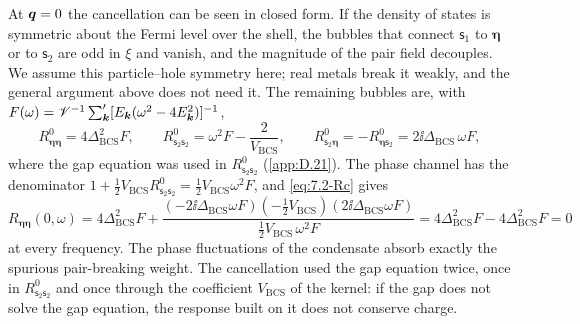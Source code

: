 At $\bm{q} = 0$ the cancellation can be seen in closed form. If the density of states is symmetric about the Fermi level over the shell, the bubbles that connect $\mathsf{s}_1$ to $\boldsymbol{\eta}$ or to $\mathsf{s}_2$ are odd in $\xi$ and vanish, and the magnitude of the pair field decouples. We assume this particle--hole symmetry here; real metals break it weakly, and the general argument above does not need it. The remaining bubbles are, with $F(\omega) = \mathscr{V}^{-1}\sum'_{\bm{k}}[E_{\bm{k}}(\omega^2 - 4E_{\bm{k}}^2)]^{-1}$,
\begin{equation}
  R^0_{\boldsymbol{\eta}\boldsymbol{\eta}} = 4\Delta_{\mathrm{BCS}}^2F, \qquad
  R^0_{\mathsf{s}_2\mathsf{s}_2} = \omega^2F - \frac{2}{V_{\mathrm{BCS}}}, \qquad
  R^0_{\mathsf{s}_2\boldsymbol{\eta}} = -R^0_{\boldsymbol{\eta}\mathsf{s}_2} = 2\ii\Delta_{\mathrm{BCS}}\,\omega F ,
  \label{eq:D.21-q0}
\end{equation}
where the gap equation was used in $R^0_{\mathsf{s}_2\mathsf{s}_2}$ (\cref{app:D.21}). The phase channel has the denominator $1 + \frac12V_{\mathrm{BCS}}R^0_{\mathsf{s}_2\mathsf{s}_2} = \frac12V_{\mathrm{BCS}}\omega^2F$, and \cref{eq:7.2-Rc} gives
\begin{equation}
  R_{\boldsymbol{\eta}\boldsymbol{\eta}}(0,\omega) = 4\Delta_{\mathrm{BCS}}^2F + \frac{(-2\ii\Delta_{\mathrm{BCS}}\omega F)(-\frac12V_{\mathrm{BCS}})(2\ii\Delta_{\mathrm{BCS}}\omega F)}{\frac12V_{\mathrm{BCS}}\,\omega^2F} = 4\Delta_{\mathrm{BCS}}^2F - 4\Delta_{\mathrm{BCS}}^2F = 0
  \label{eq:7.2-cancel}
\end{equation}
at every frequency.
The phase fluctuations of the condensate absorb exactly the spurious pair-breaking weight. The cancellation used the gap equation twice, once in $R^0_{\mathsf{s}_2\mathsf{s}_2}$ and once through the coefficient $V_{\mathrm{BCS}}$ of the kernel: if the gap does not solve the gap equation, the response built on it does not conserve charge.

